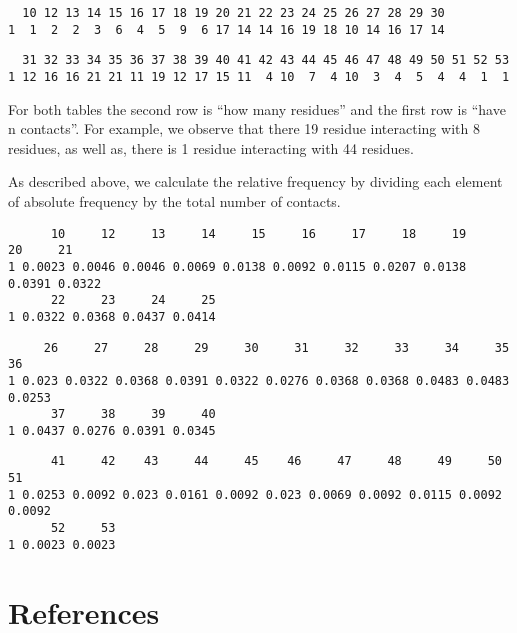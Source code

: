 \documentclass[
  letterpaper,
  DIV=11,
  numbers=noendperiod]{scrreprt}
\newlength{\cslhangindent}
\newlength{\cslentryspacingunit} %
\newenvironment{CSLReferences}[2] %
 {%
  \setlength{\parindent}{0pt}
  \ifodd #1
  \let\oldpar\par
  \def\par{\hangindent=\cslhangindent\oldpar}
  \fi
  \setlength{\parskip}{#2\cslentryspacingunit}
 }%
 {}
\begin{document}
\begin{verbatim}
  10 12 13 14 15 16 17 18 19 20 21 22 23 24 25 26 27 28 29 30
1  1  2  2  3  6  4  5  9  6 17 14 14 16 19 18 10 14 16 17 14
\end{verbatim}

\begin{verbatim}
  31 32 33 34 35 36 37 38 39 40 41 42 43 44 45 46 47 48 49 50 51 52 53
1 12 16 16 21 21 11 19 12 17 15 11  4 10  7  4 10  3  4  5  4  4  1  1
\end{verbatim}

For both tables the second row is ``how many residues'' and the first
row is ``have n contacts''. For example, we observe that there 19
residue interacting with 8 residues, as well as, there is 1 residue
interacting with 44 residues.

As described above, we calculate the relative frequency by dividing each
element of absolute frequency by the total number of contacts.

\begin{verbatim}
      10     12     13     14     15     16     17     18     19     20     21
1 0.0023 0.0046 0.0046 0.0069 0.0138 0.0092 0.0115 0.0207 0.0138 0.0391 0.0322
      22     23     24     25
1 0.0322 0.0368 0.0437 0.0414
\end{verbatim}

\begin{verbatim}
     26     27     28     29     30     31     32     33     34     35     36
1 0.023 0.0322 0.0368 0.0391 0.0322 0.0276 0.0368 0.0368 0.0483 0.0483 0.0253
      37     38     39     40
1 0.0437 0.0276 0.0391 0.0345
\end{verbatim}

\begin{verbatim}
      41     42    43     44     45    46     47     48     49     50     51
1 0.0253 0.0092 0.023 0.0161 0.0092 0.023 0.0069 0.0092 0.0115 0.0092 0.0092
      52     53
1 0.0023 0.0023
\end{verbatim}


\hypertarget{references}{%
\chapter*{References}\label{references}}


\hypertarget{refs}{}
\begin{CSLReferences}{0}{0}
\end{CSLReferences}
\end{document}
